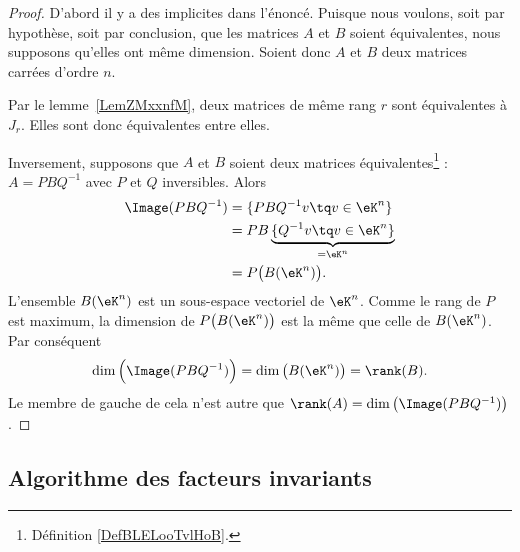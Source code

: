 \begin{proof}
	D'abord il y a des implicites dans l'énoncé. Puisque nous voulons, soit par hypothèse, soit par conclusion, que les matrices \( A\) et \( B\) soient équivalentes, nous supposons qu'elles ont même dimension. Soient donc \( A\) et \( B\) deux matrices carrées d'ordre \( n \).

	Par le lemme~\ref{LemZMxxnfM}, deux matrices de même rang \( r\) sont équivalentes à \( J_r\). Elles sont donc équivalentes entre elles.

	Inversement, supposons que \( A\) et \( B\) soient deux matrices équivalentes\footnote{Définition \ref{DefBLELooTvlHoB}.} : \( A=PBQ^{-1}\) avec \( P\) et \( Q\) inversibles. Alors
	\begin{subequations}
		\begin{align}
			\Image(PBQ^{-1}) & =\{ PBQ^{-1}v\tq v\in \eK^n \}                       \\
			                 & =PB\underbrace{\{ Q^{-1}v\tq v\in \eK^n \}}_{=\eK^n} \\
			                 & =P\big( B(\eK^n) \big).
		\end{align}
	\end{subequations}
	L'ensemble \( B(\eK^n)\) est un sous-espace vectoriel de \( \eK^n\). Comme le rang de \( P\) est maximum, la dimension de \( P\big( B(\eK^n) \big)\) est la même que celle de \( B(\eK^n)\). Par conséquent
	\begin{equation}
		\dim\Big( \Image(PBQ^{-1}) \Big)=\dim\big( B(\eK^n) \big)=\rank(B).
	\end{equation}
	Le membre de gauche de cela n'est autre que \( \rank(A)=\dim\big( \Image(PBQ^{-1}) \big)\).
\end{proof}

\subsection{Algorithme des facteurs invariants}


